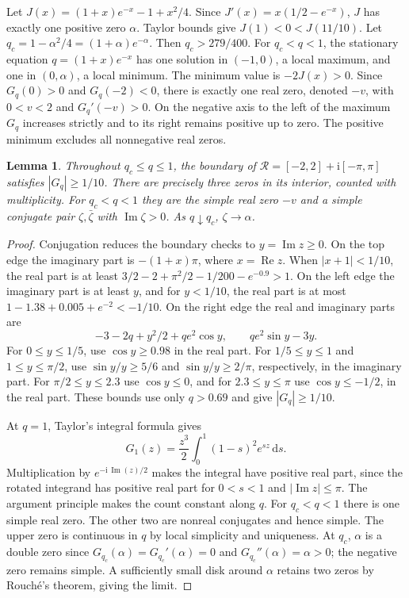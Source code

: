 \documentclass[11pt]{article}
\newtheorem{lemma}{Lemma}
\newcommand{\ii}{\mathrm{i}}
\newcommand{\Real}{\operatorname{Re}}
\newcommand{\Imag}{\operatorname{Im}}
\begin{document}
Let \(J(x)=(1+x)e^{-x}-1+x^2/4\). Since
\(J'(x)=x(1/2-e^{-x})\), \(J\) has exactly one positive zero
\(\alpha\). Taylor bounds give \(J(1)<0<J(11/10)\).
Let \(q_c=1-\alpha^2/4=(1+\alpha)e^{-\alpha}\). Then
\(q_c>279/400\). For \(q_c<q<1\), the stationary equation
\(q=(1+x)e^{-x}\) has one solution in \((-1,0)\), a local maximum,
and one in \((0,\alpha)\), a local minimum. The minimum value is
\(-2J(x)>0\). Since \(G_q(0)>0\) and \(G_q(-2)<0\), there is exactly
one real zero, denoted \(-v\), with \(0<v<2\) and \(G_q'(-v)>0\).
On the negative axis to the left of the maximum \(G_q\) increases
strictly and to its right remains positive up to zero. The positive
minimum excludes all nonnegative real zeros.

\begin{lemma}\label{lem:rectangle}
Throughout \(q_c\le q\le1\), the boundary of
\(\mathcal R=[-2,2]+\ii[-\pi,\pi]\) satisfies
\(|G_q|\ge1/10\). There are precisely three zeros in its interior,
counted with multiplicity. For \(q_c<q<1\) they are the simple
real zero \(-v\) and a simple conjugate pair \(\zeta,\bar\zeta\)
with \(\Imag\zeta>0\). As \(q\downarrow q_c\), \(\zeta\to\alpha\).
\end{lemma}

\begin{proof}
Conjugation reduces the boundary checks to \(y=\Imag z\ge0\).
On the top edge the imaginary part is \(-(1+x)\pi\), where
\(x=\Real z\). When \(|x+1|<1/10\), the real part is at least
\(3/2-2+\pi^2/2-1/200-e^{-0.9}>1\). On the left edge the
imaginary part is at least \(y\), and for \(y<1/10\),
the real part is at most \(1-1.38+0.005+e^{-2}<-1/10\).
On the right edge the real and imaginary parts are
\[
  -3-2q+y^2/2+qe^2\cos y,\qquad qe^2\sin y-3y.
\]
For \(0\le y\le1/5\), use \(\cos y\ge0.98\) in the real part.
For \(1/5\le y\le1\) and \(1\le y\le\pi/2\), use
\(\sin y/y\ge5/6\) and \(\sin y/y\ge2/\pi\), respectively,
in the imaginary part. For \(\pi/2\le y\le2.3\) use
\(\cos y\le0\), and for \(2.3\le y\le\pi\) use
\(\cos y\le-1/2\), in the real part. These bounds use only \(q>0.69\)
and give \(|G_q|\ge1/10\).

At \(q=1\), Taylor's integral formula gives
\[
 G_1(z)=\frac{z^3}{2}\int_0^1(1-s)^2e^{sz}\,\mathrm ds .
\]
Multiplication by \(e^{-\ii\,\Imag(z)/2}\) makes the integral have
positive real part, since the rotated integrand has positive
real part for \(0<s<1\) and \(|\Imag z|\le\pi\).
The argument principle makes the count constant along \(q\).
For \(q_c<q<1\) there is one simple real zero. The other two are
nonreal conjugates and hence simple. The upper zero is continuous
in \(q\) by local simplicity and uniqueness. At \(q_c\), \(\alpha\)
is a double zero since \(G_{q_c}(\alpha)=G_{q_c}'(\alpha)=0\) and
\(G_{q_c}''(\alpha)=\alpha>0\); the negative zero remains simple.
A sufficiently small disk around \(\alpha\) retains two zeros by
Rouch\'e's theorem, giving the limit.
\end{proof}
\end{document}
